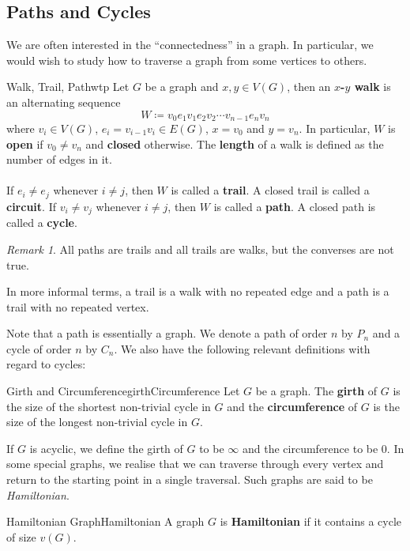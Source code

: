 \documentclass[math, code]{amznotes}
\theoremstyle{remark}
\newtheorem*{remark}{Remark}
\begin{document}
\subsection{Paths and Cycles}
We are often interested in the ``connectedness'' in a graph. In particular, we would wish to study how to traverse a graph from some vertices to others.
\begin{dfnbox}{Walk, Trail, Path}{wtp}
    Let $G$ be a graph and $x, y \in V(G)$, then an {\color{red} \textbf{$x$-$y$ walk}} is an alternating sequence
    \begin{equation*}
        W \coloneqq v_0e_1v_1e_2v_2\cdots v_{n - 1}e_nv_n
    \end{equation*}
    where $v_i \in V(G)$, $e_i = v_{i - 1}v_i \in E(G)$, $x = v_0$ and $y = v_n$. In particular, $W$ is {\color{red} \textbf{open}} if $v_0 \neq v_n$ and {\color{red} \textbf{closed}} otherwise. The {\color{red} \textbf{length}} of a walk is defined as the number of edges in it.
    \\\\
    If $e_i \neq e_j$ whenever $i \neq j$, then $W$ is called a {\color{red} \textbf{trail}}. A closed trail is called a {\color{red} \textbf{circuit}}. If $v_i \neq v_j$ whenever $i \neq j$, then $W$ is called a {\color{red} \textbf{path}}. A closed path is called a {\color{red} \textbf{cycle}}.
\end{dfnbox}
\begin{notebox}
    \begin{remark}
        All paths are trails and all trails are walks, but the converses are not true.
    \end{remark}
\end{notebox}
In more informal terms, a trail is a walk with no repeated edge and a path is a trail with no repeated vertex.

Note that a path is essentially a graph. We denote a path of order $n$ by $P_n$ and a cycle of order $n$ by $C_n$. We also have the following relevant definitions with regard to cycles:
\begin{dfnbox}{Girth and Circumference}{girthCircumference}
    Let $G$ be a graph. The {\color{red} \textbf{girth}} of $G$ is the size of the shortest non-trivial cycle in $G$ and the {\color{red} \textbf{circumference}} of $G$ is the size of the longest non-trivial cycle in $G$.
\end{dfnbox}
If $G$ is acyclic, we define the girth of $G$ to be $\infty$ and the circumference to be $0$. In some special graphs, we realise that we can traverse through every vertex and return to the starting point in a single traversal. Such graphs are said to be \textit{Hamiltonian}.
\begin{dfnbox}{Hamiltonian Graph}{Hamiltonian}
    A graph $G$ is {\color{red} \textbf{Hamiltonian}} if it contains a cycle of size $v(G)$.
\end{dfnbox}
\end{document}
